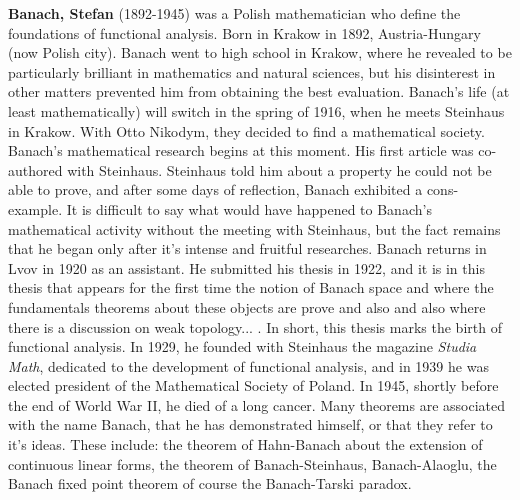 \textbf{Banach, Stefan} (1892-1945) was a Polish mathematician who define the foundations of functional analysis. Born in Krakow in 1892, Austria-Hungary (now Polish city). Banach went to high school in Krakow, where he revealed to be particularly brilliant in mathematics and natural sciences, but his disinterest in other matters prevented him from obtaining the best evaluation. Banach's life (at least mathematically) will switch in the spring of 1916, when he meets Steinhaus in Krakow. With Otto Nikodym, they decided to find a mathematical society. Banach's mathematical research begins at this moment. His first article was co-authored with Steinhaus. Steinhaus told him about a property he could not be able to prove, and after some days of reflection, Banach exhibited a cons-example. It is difficult to say what would have happened to Banach's mathematical activity without the meeting with Steinhaus, but the fact remains that he began only after it's intense and fruitful researches. Banach returns in Lvov in 1920 as an assistant. He submitted his thesis in 1922, and it is in this thesis that appears for the first time the notion of Banach space and where the fundamentals theorems about these objects are prove and also and also where there is a discussion on weak topology... . In short, this thesis marks the birth of functional analysis. In 1929, he founded with Steinhaus the magazine \textit{Studia Math}, dedicated to the development of functional analysis, and in 1939 he was elected president of the Mathematical Society of Poland. In 1945, shortly before the end of World War II, he died of a long cancer. Many theorems are associated with the name Banach, that he has demonstrated himself, or that they refer to it's ideas. These include: the theorem of Hahn-Banach about the extension of continuous linear forms, the theorem of Banach-Steinhaus, Banach-Alaoglu, the Banach fixed point theorem of course the Banach-Tarski paradox.

